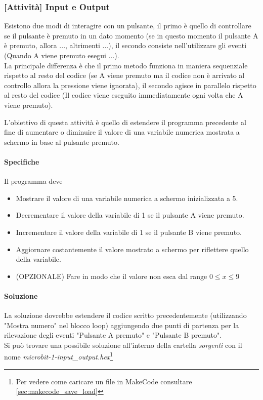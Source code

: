 \documentclass[../../docenti.tex]{subfiles}
\begin{document}
\subsubsection{[Attività] Input e Output}
Esistono due modi di interagire con un pulsante, il primo è quello di controllare se il pulsante è premuto in un dato momento (se in questo momento il pulsante A è premuto, allora ..., altrimenti ...), il secondo consiste nell'utilizzare gli eventi (Quando A viene premuto esegui ...).\\
La principale differenza è che il primo metodo funziona in maniera sequenziale rispetto al resto del codice (se A viene premuto ma il codice non è arrivato al controllo allora la pressione viene ignorata), il secondo agisce in parallelo rispetto al resto del codice (Il codice viene eseguito immediatamente ogni volta che A viene premuto).

\vspace{1em}
L'obiettivo di questa attività è quello di estendere il programma precedente al fine di aumentare o diminuire il valore di una variabile numerica mostrata a schermo in base al pulsante premuto.

\paragraph{Specifiche}
Il programma deve
\begin{itemize}
	\item Mostrare il valore di una variabile numerica a schermo inizializzata a 5.
	\item Decrementare il valore della variabile di 1 se il pulsante A viene premuto.
	\item Incrementare il valore della variabile di 1 se il pulsante B viene premuto.
	\item Aggiornare costantemente il valore mostrato a schermo per riflettere quello della variabile.
	\item (OPZIONALE) Fare in modo che il valore non esca dal range \(0\leq x \leq 9\)
\end{itemize}

\paragraph{Soluzione}
La soluzione dovrebbe estendere il codice scritto precedentemente (utilizzando "Mostra numero" nel blocco loop) aggiungendo due punti di partenza per la rilevazione degli eventi "Pulsante A premuto" e "Pulsante B premuto".\\
Si può trovare una possibile soluzione all'interno della cartella \textit{sorgenti} con il nome \textit{microbit-1-input\_output.hex}\footnote{Per vedere come caricare un file in MakeCode consultare \autoref{sec:makecode_save_load}}
\end{document}
